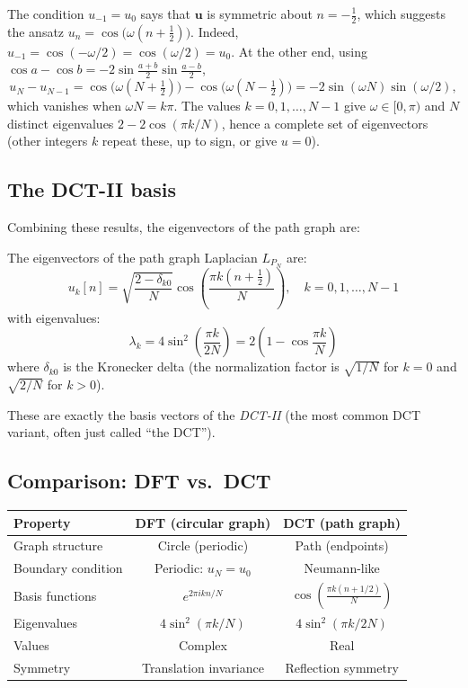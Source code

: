 \begin{notechapter}
The condition $u_{-1} = u_0$ says that $\mathbf u$ is symmetric about $n = -\frac12$, which suggests the ansatz $u_n = \cos\bigl(\omega(n+\frac12)\bigr)$. Indeed, $u_{-1} = \cos(-\omega/2) = \cos(\omega/2) = u_0$. At the other end, using $\cos a - \cos b = -2\sin\frac{a+b}{2}\sin\frac{a-b}{2}$,
\[
u_N - u_{N-1} = \cos\bigl(\omega(N+\tfrac12)\bigr) - \cos\bigl(\omega(N-\tfrac12)\bigr) = -2\sin(\omega N)\sin(\omega/2),
\]
which vanishes when $\omega N = k\pi$. The values $k = 0, 1, \ldots, N-1$ give $\omega \in [0, \pi)$ and $N$ distinct eigenvalues $2 - 2\cos(\pi k/N)$, hence a complete set of eigenvectors (other integers $k$ repeat these, up to sign, or give $u = 0$).

\subsection{The DCT-II basis}

Combining these results, the eigenvectors of the path graph are:

\begin{theorem}[Path graph eigenvectors = DCT-II basis]
\label{dft-to-gnn:thm:path-dct}
The eigenvectors of the path graph Laplacian $L_{P_N}$ are:
\begin{equation}
u_k[n] = \sqrt{\frac{2 - \delta_{k0}}{N}} \cos\left(\frac{\pi k (n + \frac{1}{2})}{N}\right),
\quad k = 0, 1, \ldots, N-1
\end{equation}
with eigenvalues:
\begin{equation}
\lambda_k = 4\sin^2\left(\frac{\pi k}{2N}\right) =
2\left(1 - \cos\frac{\pi k}{N}\right)
\end{equation}
where $\delta_{k0}$ is the Kronecker delta (the normalization factor
is $\sqrt{1/N}$ for $k=0$ and $\sqrt{2/N}$ for $k > 0$).
\end{theorem}

These are exactly the basis vectors of the \emph{DCT-II} (the most
common DCT variant, often just called ``the DCT'').

\subsection{Comparison: DFT vs.\ DCT}

\begin{center}
\renewcommand{\arraystretch}{1.4}
\begin{tabular}{lcc}
\toprule
Property & DFT (circular graph) & DCT (path graph) \\
\midrule
Graph structure & Circle (periodic) & Path (endpoints) \\
Boundary condition & Periodic: $u_{N} = u_0$ & Neumann-like \\
Basis functions & $e^{2\pi i kn/N}$ & $\cos\left(\frac{\pi k(n+1/2)}{N}\right)$ \\
Eigenvalues & $4\sin^2(\pi k/N)$ & $4\sin^2(\pi k/2N)$ \\
Values & Complex & Real \\
Symmetry & Translation invariance & Reflection symmetry \\
\bottomrule
\end{tabular}
\end{center}


\end{notechapter}
